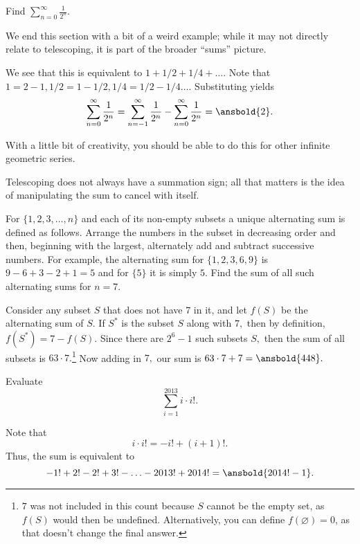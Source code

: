 \documentclass{article}
\begin{document}
\begin{exam}
Find $\sum\limits_{n=0}^{\infty} \frac{1}{2^n}.$
\end{exam}

We end this section with a bit of a weird example; while it may not directly relate to telescoping, it is part of the broader ``sums'' picture.

\begin{sol}
We see that this is equivalent to $1+1/2+1/4+\dots.$ Note that $1=2-1,1/2=1-1/2,1/4=1/2-1/4\dots.$ Substituting yields \[\sum\limits_{n=0}^{\infty}\frac{1}{2^n}=\sum\limits_{n=-1}^{\infty} \frac{1}{2^n}-\sum\limits_{n=0}^{\infty}\frac{1}{2^n}=\ansbold{2}.\]

With a little bit of creativity, you should be able to do this for other infinite geometric series.
\end{sol}

Telescoping does not always have a summation sign; all that matters is the idea of manipulating the sum to cancel with itself.

\begin{exam}[AIME 1983/13]
For $\{1, 2, 3, \ldots, n\}$ and each of its non-empty subsets a unique alternating sum is defined as follows. Arrange the numbers in the subset in decreasing order and then, beginning with the largest, alternately add and subtract successive numbers. For example, the alternating sum for $\{1, 2, 3, 6,9\}$ is $9-6+3-2+1=5$ and for $\{5\}$ it is simply $5$. Find the sum of all such alternating sums for $n=7$. 
\end{exam}

\begin{sol}
Consider any subset $S$ that does not have $7$ in it, and let $f(S)$ be the alternating sum of $S$. If $S^{*}$ is the subset $S$ along with $7,$ then by definition, $f(S^*)=7-f(S).$ Since there are $2^6-1$ such subsets $S,$ then the sum of all subsets  is $63\cdot 7.$\footnote{$7$ was not included in this count because $S$ cannot be the empty set, as $f(S)$ would then be undefined. Alternatively, you can define $f(\varnothing)=0$, as that doesn't change the final answer.} Now adding in $7,$ our sum is $63\cdot 7+7=\ansbold{448}.$
\end{sol}

\begin{exam}[LMT 2014/I15]
Evaluate
\[\sum_{i=1}^{2013} i\cdot i!.\]
\end{exam}

\begin{sol}
Note that
\[i\cdot i! = -i!+(i+1)!.\]
Thus, the sum is equivalent to
\[-1!+2!-2!+3!-\ldots-2013!+2014! = \ansbold{2014!-1}.\]
\end{sol}
\end{document}
